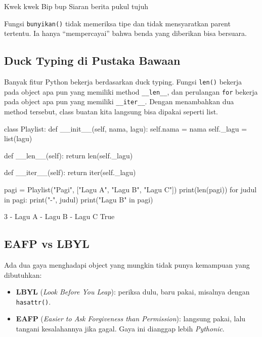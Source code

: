 \begin{keluaran}
Kwek kwek
Bip bup
Siaran berita pukul tujuh
\end{keluaran}

Fungsi \texttt{bunyikan()} tidak memeriksa tipe dan tidak mensyaratkan parent tertentu. Ia hanya ``mempercayai'' bahwa benda yang diberikan bisa bersuara.

\subsection{Duck Typing di Pustaka Bawaan}

Banyak fitur Python bekerja berdasarkan duck typing. Fungsi \texttt{len()} bekerja pada object apa pun yang memiliki method \texttt{\_\_len\_\_}, dan perulangan \texttt{for} bekerja pada object apa pun yang memiliki \texttt{\_\_iter\_\_}. Dengan menambahkan dua method tersebut, class buatan kita langsung bisa dipakai seperti list.

\begin{kode}
class Playlist:
    def __init__(self, nama, lagu):
        self.nama = nama
        self._lagu = list(lagu)

    def __len__(self):
        return len(self._lagu)

    def __iter__(self):
        return iter(self._lagu)

pagi = Playlist("Pagi", ["Lagu A", "Lagu B", "Lagu C"])
print(len(pagi))
for judul in pagi:
    print("-", judul)
print("Lagu B" in pagi)
\end{kode}

\begin{keluaran}
3
- Lagu A
- Lagu B
- Lagu C
True
\end{keluaran}

\subsection{EAFP vs LBYL}

Ada dua gaya menghadapi object yang mungkin tidak punya kemampuan yang dibutuhkan:

\begin{itemize}
  \item \textbf{LBYL} (\emph{Look Before You Leap}): periksa dulu, baru pakai, misalnya dengan \texttt{hasattr()}.
  \item \textbf{EAFP} (\emph{Easier to Ask Forgiveness than Permission}): langsung pakai, lalu tangani kesalahannya jika gagal. Gaya ini dianggap lebih \emph{Pythonic}.
\end{itemize}

